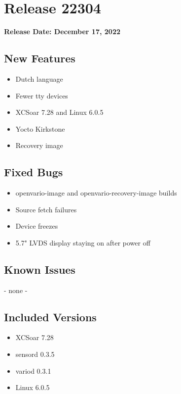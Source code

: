\chapter*{Release 22304}

\begin{flushleft}
	\textbf{Release Date: December 17, 2022}
\end{flushleft}

\section*{New Features}

\begin{itemize}
	\item Dutch language
	\item Fewer tty devices
	\item XCSoar 7.28 and Linux 6.0.5
	\item Yocto Kirkstone
	\item Recovery image
\end{itemize}

\section*{Fixed Bugs}
\begin{itemize}
	\item openvario-image and openvario-recovery-image builds
	\item Source fetch failures
	\item Device freezes
	\item 5.7" LVDS display staying on after power off
\end{itemize}

\section*{Known Issues}
	- none -

\section*{Included Versions}

\begin{itemize}
	\item XCSoar 7.28
	\item sensord 0.3.5
	\item variod 0.3.1
	\item Linux 6.0.5
\end{itemize}
